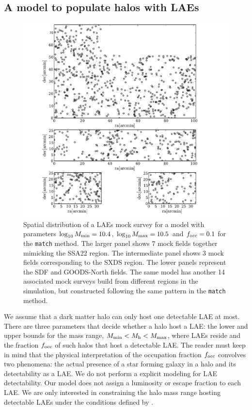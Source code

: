 \documentclass[usenatbib]{mn2e}
\begin{document}
\subsection{A model to populate halos with LAEs}
\label{subsec:mocks}



\begin{figure}
\begin{center}
\includegraphics[width=0.8\linewidth,angle=0]{Figure0.pdf}
\caption{ \label{fig:distros} Spatial distribution of a LAEs mock
  survey for a model with parameters $\log_{10}M_{\rm min}=10.4$, $\log_{10}M_{\rm
    max}=10.5$ and $f_{\rm occ}=0.1$ for the {\texttt{match}}
  method. The larger panel shows $7$ mock
  fields together mimicking the SSA22 region. The intermediate panel
  shows $3$ mock fields corresponding to the SXDS region. The lower
  panels represent the SDF and GOODS-North fields. The same model has
  another 14 associated mock surveys build from different regions in
  the simulation, but constructed following the same pattern in the
  {\texttt{match}} method.}
\end{center} 
\end{figure}


We assume that a dark matter halo can only host one
detectable LAE at most.  There are three parameters that
decide whether a halo host a LAE: the lower and upper bounds for the
mass range, $M_{\rm min}< M_{\rm h} < M_{\rm max}$, where LAEs reside and the fraction $f_{\rm occ}$ of such halos that host a detectable LAE. The reader
must keep in mind that the physical interpretation of the occupation
fraction $f_{\rm occ}$ convolves two phenomena: the actual presence of a star
forming galaxy in a halo and its detectability as a LAE.  We do not
perform a explicit modeling for LAE detectability. Our model does not
assign a luminosity or escape fraction to each LAE.  We are only
interested in constraining the halo mass range hosting detectable LAEs
under the conditions defined by \cite{Yamada2012}.  
\end{document}
